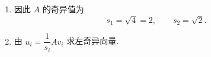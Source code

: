 \begin{solution}
\begin{enumerate}
              其特征多项式为
              \[
                  \left| \lambda E - A^{\mathrm{T}}A \right|
                  =
                  \begin{vmatrix}
                      \lambda - 3 & -1          \\
                      -1          & \lambda - 3
                  \end{vmatrix}
                  =
                  (\lambda - 3)^2 - 1
                  =
                  (\lambda - 4)(\lambda - 2).
              \]
              所以特征值为 $ 4 $ 与 $ 2 $.

              对应地，
              \[
                  \lambda = 4 \text{ 时，可取特征向量 } (1, 1)^{\mathrm{T}},
              \]
              \[
                  \lambda = 2 \text{ 时，可取特征向量 } (1, -1)^{\mathrm{T}}.
              \]
              归一化后得到一组标准正交特征向量
              \[
                  v_1 = \frac{1}{\sqrt{2}}\begin{pmatrix}
                      1 \\
                      1
                  \end{pmatrix},\qquad
                  v_2 = \frac{1}{\sqrt{2}}\begin{pmatrix}
                      1  \\
                      -1
                  \end{pmatrix}.
              \]

        \item 因此 $ A $ 的奇异值为
              \[
                  s_1 = \sqrt{4} = 2,\qquad s_2 = \sqrt{2}.
              \]

        \item 由 $ u_i = \dfrac{1}{s_i}Av_i $ 求左奇异向量.


\end{enumerate}
\end{solution}
